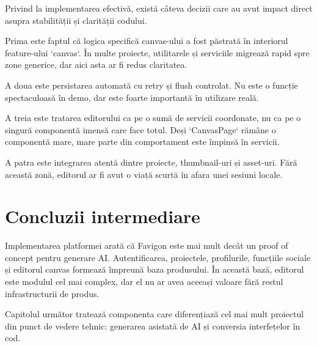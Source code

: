 Privind la implementarea efectivă, există câteva decizii care au avut impact direct asupra stabilității și clarității codului.

Prima este faptul că logica specifică canvas-ului a fost păstrată în interiorul feature-ului `canvas`. În multe proiecte, utilitarele și serviciile migrează rapid spre zone generice, dar aici asta ar fi redus claritatea.

A doua este persistarea automată cu retry și flush controlat. Nu este o funcție spectaculoasă în demo, dar este foarte importantă în utilizare reală.

A treia este tratarea editorului ca pe o sumă de servicii coordonate, nu ca pe o singură componentă imensă care face totul. Deși `CanvasPage` rămâne o componentă mare, mare parte din comportament este împinsă în servicii.

A patra este integrarea atentă dintre proiecte, thumbnail-uri și asset-uri. Fără această zonă, editorul ar fi avut o viață scurtă în afara unei sesiuni locale.

\section{Concluzii intermediare}

Implementarea platformei arată că Favigon este mai mult decât un proof of concept pentru generare AI. Autentificarea, proiectele, profilurile, funcțiile sociale și editorul canvas formează împreună baza produsului. În această bază, editorul este modulul cel mai complex, dar el nu ar avea aceeași valoare fără restul infrastructurii de produs.

Capitolul următor tratează componenta care diferențiază cel mai mult proiectul din punct de vedere tehnic: generarea asistată de AI și conversia interfețelor în cod.
